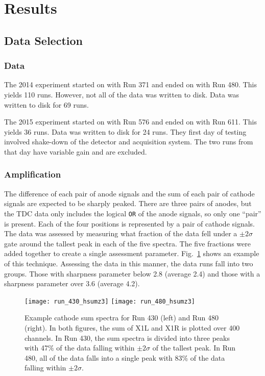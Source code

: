 \section{Results}
\subsection{Data Selection}
\subsubsection{Data}
The 2014 experiment started on \longusdate{} with Run 371 and ended on \longusdate{} with Run 480. This yields 110 runs. However, not all of the data was written to disk. Data was written to disk for 69 runs.

The 2015 experiment started on \longusdate{} with Run 576 and ended on \longusdate{} with Run 611. This yields 36 runs.  Data was written to disk for 24 runs. They first day of testing involved shake-down of the detector and acquisition system. The two runs from that day have variable gain and are excluded.
\subsubsection{Amplification}
The difference of each pair of anode signals and the sum of each pair of cathode signals are expected to be sharply peaked. There are three pairs of anodes, but the TDC data only includes the logical \texttt{OR} of the anode signals, so only one ``pair'' is present. Each of the four positions is represented by a pair of cathode signals. The data was assessed by measuring what fraction of the data fell under a $\pm 2 \sigma$ gate around the tallest peak in each of the five spectra. The five fractions were added together to create a single assessment parameter. Fig.~\ref{hsumz} shows an example of this technique. Assessing the data in this manner, the data runs fall into two groups. Those with sharpness parameter below 2.8 (average 2.4) and those with a sharpness parameter over 3.6 (average 4.2).

\begin{figure}[ht]
\centering
\hspace{\fill}
\texttt{[image: run\_430\_hsumz3]}\hspace{\fill}
\texttt{[image: run\_480\_hsumz3]} \hspace{\fill}
\caption{Example cathode sum spectra for Run 430 (left) and Run 480 (right). In both figures, the sum of X1L and X1R is plotted over 400 channels. In Run 430, the sum spectra is divided into three peaks with 47\% of the data falling within $\pm 2 \sigma$ of the tallest peak. In Run 480, all of the data falls into a single peak with 83\% of the data falling within $\pm 2 \sigma$.}
\label{hsumz}
\end{figure}

